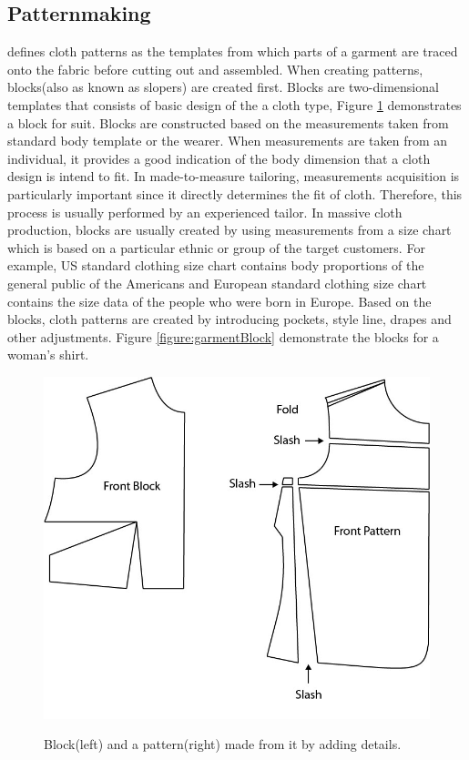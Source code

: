\subsection{Patternmaking}

 defines cloth patterns as the templates from which parts of a garment are traced onto the fabric before cutting out and assembled. When creating patterns, blocks(also as known as slopers) are created first. Blocks are two-dimensional templates that consists of basic design of the a cloth type, Figure \ref{figure:BlocktoPattern} demonstrates a block for suit. Blocks are constructed based on the measurements taken from standard body template or the wearer. When measurements are taken from an individual, it provides a good indication of the body dimension that a cloth design is intend to fit. In made-to-measure tailoring, measurements acquisition is particularly important since it directly determines the fit of cloth. Therefore, this process is usually performed by an experienced tailor. In massive cloth production, blocks are usually created by using measurements from a size chart which is based on a particular ethnic or group of the target customers. For example, US standard clothing size chart contains body proportions of the general public of the Americans and European standard clothing size chart contains the size data of the people who were born in Europe. Based on the blocks, cloth patterns are created by introducing pockets, style line, drapes and other adjustments. Figure \ref{figure:garmentBlock} demonstrate the blocks for a woman's shirt.
 
\begin{figure}[H]
	\includegraphics[width=\columnwidth]{../images/block_pattern}\\[0.1cm]
    \caption{Block(left) and a pattern(right) made from it by adding details.}
    \label{figure:BlocktoPattern}
\end{figure}

